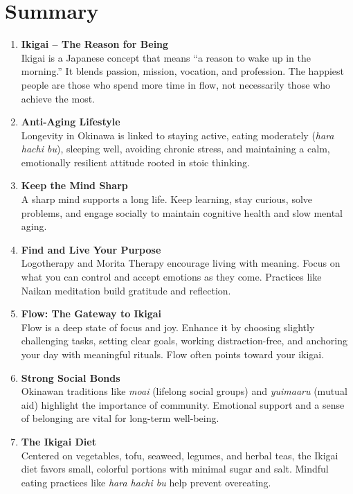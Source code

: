 \section*{Summary}
\begin{enumerate}
    \item \textbf{Ikigai – The Reason for Being} \\
    Ikigai is a Japanese concept that means “a reason to wake up in the morning.” It blends passion, mission, vocation, and profession. The happiest people are those who spend more time in flow, not necessarily those who achieve the most.

    \item \textbf{Anti-Aging Lifestyle} \\
    Longevity in Okinawa is linked to staying active, eating moderately (\textit{hara hachi bu}), sleeping well, avoiding chronic stress, and maintaining a calm, emotionally resilient attitude rooted in stoic thinking.

    \item \textbf{Keep the Mind Sharp} \\
    A sharp mind supports a long life. Keep learning, stay curious, solve problems, and engage socially to maintain cognitive health and slow mental aging.

    \item \textbf{Find and Live Your Purpose} \\
    Logotherapy and Morita Therapy encourage living with meaning. Focus on what you can control and accept emotions as they come. Practices like Naikan meditation build gratitude and reflection.

    \item \textbf{Flow: The Gateway to Ikigai} \\
    Flow is a deep state of focus and joy. Enhance it by choosing slightly challenging tasks, setting clear goals, working distraction-free, and anchoring your day with meaningful rituals. Flow often points toward your ikigai.

    \item \textbf{Strong Social Bonds} \\
    Okinawan traditions like \textit{moai} (lifelong social groups) and \textit{yuimaaru} (mutual aid) highlight the importance of community. Emotional support and a sense of belonging are vital for long-term well-being.

    \item \textbf{The Ikigai Diet} \\
    Centered on vegetables, tofu, seaweed, legumes, and herbal teas, the Ikigai diet favors small, colorful portions with minimal sugar and salt. Mindful eating practices like \textit{hara hachi bu} help prevent overeating.


\end{enumerate}

